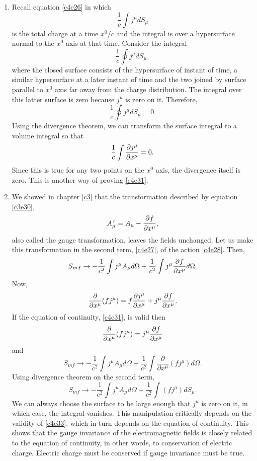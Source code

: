 \begin{enumerate}
\item Recall equation \eqref{c4e26} in which
\[
\frac{1}{c}\int j^\mu dS_\mu
\]
is the total charge at a time $x^0/c$ and the integral is over a hypersurface 
normal to the $x^0$ axis at that time. Consider the integral
\[
\frac{1}{c}\oint j^\mu dS_\mu,
\]
where the closed surface consists of the hypersurface of instant of time, a
similar hypersurface at a later instant of time and the two joined by surface
parallel to $x^0$ axis far away from the charge distribution. The integral over
this latter surface is zero because $j^\mu$ is zero on it. Therefore,
\begin{equation}\label{c4e32}
\frac{1}{c}\oint j^\mu dS_\mu = 0.
\end{equation}
Using the divergence theorem, we can transform the surface integral to a volume
integral so that
\[
\frac{1}{c}\int \frac{\partial{j^\mu}}{\partial{x^\mu}} = 0.
\]
Since this is true for any two points on the $x^0$ axis, the divergence itself
is zero. This is another way of proving \eqref{c4e31}.

\item We showed in chapter \ref{c3} that the transformation described by equation
\eqref{c3e30},
\[
A_\mu^{\,\prime} = A_\mu - \frac{\partial{f}}{\partial{x^\mu}},
\]
also called the gauge transformation, leaves the fields unchanged. Let us make 
this transformation in the second term, \eqref{c4e27}, of the action \eqref{c4e28}.
Then,
\[
S_{mf} \rightarrow -\frac{1}{c^2}\int j^\mu A_\mu d\Omega + \frac{1}{c^2}
\int j^\mu\frac{\partial{f}}{\partial{x^\mu}} d\Omega.
\]
Now,
\[
\frac{\partial}{\partial x^\mu}(fj^\mu) = f\frac{\partial{j^\mu}}{\partial{x^\mu}} + j^\mu\frac{\partial{f}}{\partial{x^\mu}}.
\]
If the equation of continuity, \eqref{c4e31}, is valid then
\begin{equation}\label{c4e33}
\frac{\partial}{\partial x^\mu}(fj^\mu) = j^\mu\frac{\partial{f}}{\partial{x^\mu}}
\end{equation}
and
\[
S_{mf} \rightarrow -\frac{1}{c^2}\int j^\mu A_\mu d\Omega + \frac{1}{c^2}
\int \frac{\partial}{\partial x^\mu}(fj^\mu) d\Omega.
\]
Using divergence theorem on the second term,
\[
S_{mf} \rightarrow -\frac{1}{c^2}\int j^\mu A_\mu d\Omega + \frac{1}{c^2}
\int (fj^\mu) dS_\mu.
\]
We can always choose the surface to be large enough that $j^\mu$ is zero on it,
in which case, the integral vanishes. This manipulation critically depends on the
validity of \eqref{c4e33}, which in turn depends on the equation of continuity.
This shows that the gauge invariance of the electromagnetic fields is closely
related to the equation of continuity, in other words, to conservation of 
electric charge. Electric charge must be conserved if gauge invariance must be
true.


\end{enumerate}

